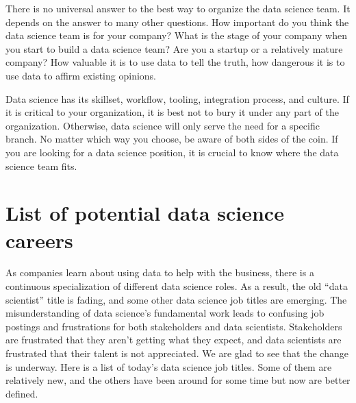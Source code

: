 \documentclass[12pt,]{krantz}
\begin{document}
There is no universal answer to the best way to organize the data science team. It depends on the answer to many other questions. How important do you think the data science team is for your company? What is the stage of your company when you start to build a data science team? Are you a startup or a relatively mature company? How valuable it is to use data to tell the truth, how dangerous it is to use data to affirm existing opinions.

Data science has its skillset, workflow, tooling, integration process, and culture. If it is critical to your organization, it is best not to bury it under any part of the organization. Otherwise, data science will only serve the need for a specific branch. No matter which way you choose, be aware of both sides of the coin. If you are looking for a data science position, it is crucial to know where the data science team fits.

\hypertarget{list-of-potential-data-science-careers}{%
\section{List of potential data science careers}\label{list-of-potential-data-science-careers}}

As companies learn about using data to help with the business, there is a continuous specialization of different data science roles.
As a result, the old ``data scientist'' title is fading, and some other data science job titles are emerging. The misunderstanding of data science's fundamental work leads to confusing job postings and frustrations for both stakeholders and data scientists. Stakeholders are frustrated that they aren't getting what they expect, and data scientists are frustrated that their talent is not appreciated. We are glad to see that the change is underway. Here is a list of today's data science job titles. Some of them are relatively new, and the others have been around for some time but now are better defined.
\end{document}
